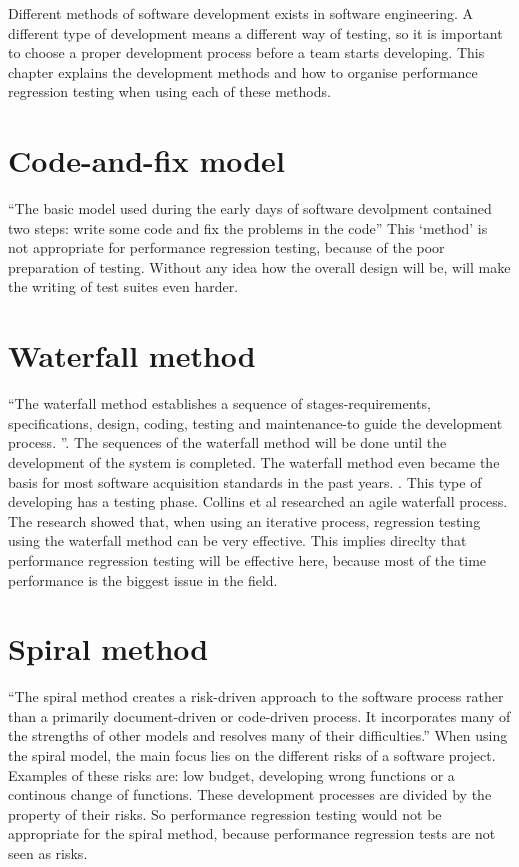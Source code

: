 Different methods of software development exists in software engineering. A different type of development means a different way of testing, so it is important to choose a proper development process before a team starts developing. This chapter explains the development methods and how to organise performance regression testing when using each of these methods.

\section{Code-and-fix model}
``The basic model used during the early days of software devolpment contained two steps: write some code and fix the problems in the code'' \cite{boehm1988spiral} This `method' is not appropriate for performance regression testing, because of the poor preparation of testing. Without any idea how the overall design will be, will make the writing of test suites even harder.

\section{Waterfall method}
``The waterfall method establishes a sequence of stages-requirements, specifications, design, coding, testing and maintenance-to guide the development process. ''\cite{kang1989software}. The sequences of the waterfall method will be done until the development of the system is completed. The waterfall method even became the basis for most software acquisition standards in the past years. \cite{boehm1988spiral}. This type of developing has a testing phase. Collins et al researched an agile waterfall process. \cite{collins2010iterative} The research showed that, when using an iterative process, regression testing using the waterfall method can be very effective. This implies direclty that performance regression testing will be effective here, because most of the time performance is the biggest issue in the field. \cite{foo2010mining}

\section{Spiral method}
``The spiral method creates a risk-driven approach to the software process rather than a primarily document-driven or code-driven process. It incorporates many of the strengths
of other models and resolves many of their
difficulties.''\cite{boehm1988spiral} When using the spiral model, the main focus lies on the different risks of a software project. Examples of these risks are: low budget, developing wrong functions or a continous change of functions. These development processes are divided by the property of their risks. So performance regression testing would not be appropriate for the spiral method, because performance regression tests are not seen as risks.

